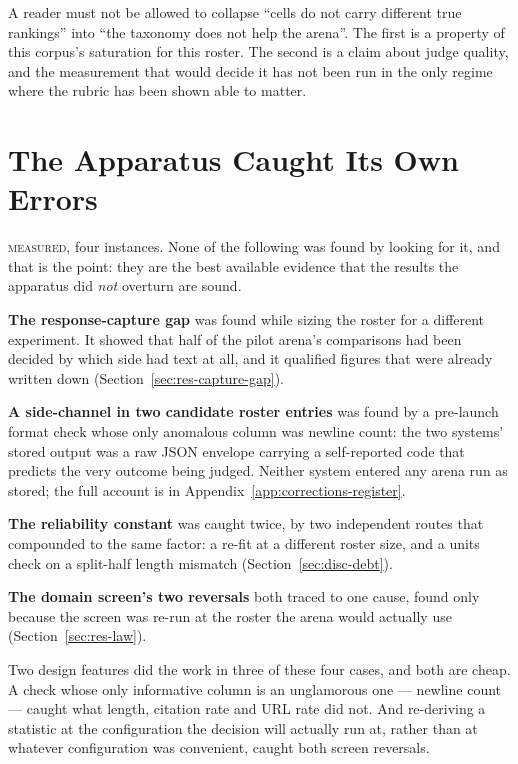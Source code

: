 A reader must not be allowed to collapse ``cells do not carry different
true rankings'' into ``the taxonomy does not help the arena''. The first
is a property of this corpus's saturation for this roster. The second is
a claim about judge quality, and the measurement that would decide it
has not been run in the only regime where the rubric has been shown able
to matter.

\section{The Apparatus Caught Its Own Errors}\label{sec:disc-dq1}\label{sec:disc-selfcheck}

\textsc{measured}, four instances. None of the following was found by
looking for it, and that is the point: they are the best available
evidence that the results the apparatus did \emph{not} overturn are
sound.

\textbf{The response-capture gap} was found while sizing the roster for
a different experiment. It showed that half of the pilot arena's
comparisons had been decided by which side had text at all, and it
qualified figures that were already written down
(Section~\ref{sec:res-capture-gap}).

\textbf{A side-channel in two candidate roster entries} was found by a
pre-launch format check whose only anomalous column was newline count:
the two systems' stored output was a raw JSON envelope carrying a
self-reported code that predicts the very outcome being judged.
Neither system entered any arena run as stored; the full account is in
Appendix~\ref{app:corrections-register}.

\textbf{The reliability constant} was caught twice, by two independent
routes that compounded to the same factor: a re-fit at a different
roster size, and a units check on a split-half length mismatch
(Section~\ref{sec:disc-debt}).

\textbf{The domain screen's two reversals} both traced to one cause,
found only because the screen was re-run at the roster the arena would
actually use (Section~\ref{sec:res-law}).

Two design features did the work in three of these four cases, and both
are cheap. A check whose only informative column is an unglamorous one
--- newline count --- caught what length, citation rate and URL rate
did not. And re-deriving a statistic at the configuration the decision
will actually run at, rather than at whatever configuration was
convenient, caught both screen reversals.


